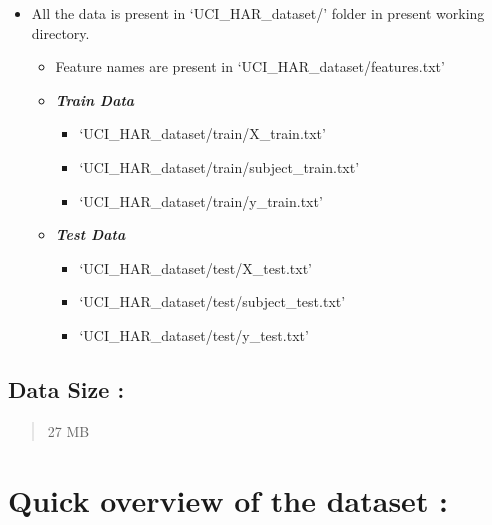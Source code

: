 \documentclass[11pt]{article}
\providecommand{\tightlist}{%
      \setlength{\itemsep}{0pt}\setlength{\parskip}{0pt}}
\begin{document}
\begin{itemize}
\tightlist
\item
  All the data is present in `UCI\_HAR\_dataset/' folder in present
  working directory.

  \begin{itemize}
  \tightlist
  \item
    Feature names are present in `UCI\_HAR\_dataset/features.txt'
  \item
    \textbf{\emph{Train Data}}

    \begin{itemize}
    \tightlist
    \item
      `UCI\_HAR\_dataset/train/X\_train.txt'
    \item
      `UCI\_HAR\_dataset/train/subject\_train.txt'
    \item
      `UCI\_HAR\_dataset/train/y\_train.txt'
    \end{itemize}
  \item
    \textbf{\emph{Test Data}}

    \begin{itemize}
    \tightlist
    \item
      `UCI\_HAR\_dataset/test/X\_test.txt'
    \item
      `UCI\_HAR\_dataset/test/subject\_test.txt'
    \item
      `UCI\_HAR\_dataset/test/y\_test.txt'
    \end{itemize}
  \end{itemize}
\end{itemize}

\hypertarget{data-size}{%
\subsection{Data Size :}\label{data-size}}

\begin{quote}
27 MB
\end{quote}

    

    

    

    \hypertarget{quick-overview-of-the-dataset}{%
\section{Quick overview of the dataset
:}\label{quick-overview-of-the-dataset}}
\end{document}
